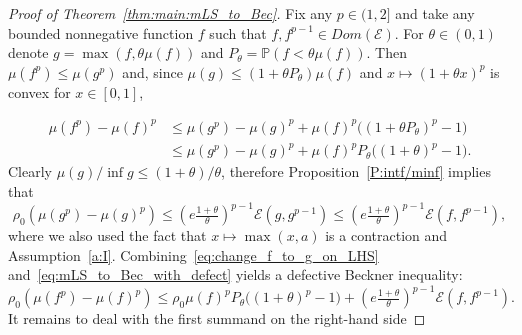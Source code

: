 \documentclass[a4paper]{amsart}
\theoremstyle{definition}
\theoremstyle{remark}
\numberwithin{equation}{section}
\newcommand*{\calE}{\mathcal{E}}
\begin{document}
\begin{proof}[Proof of Theorem~\ref{thm:main:mLS_to_Bec}]
Fix any $p\in(1,2]$ and take any bounded nonnegative function $f$ such that $f,f^{p-1}\in Dom(\calE)$.
For $\theta\in (0,1)$ denote $g = \max(f,\theta \mu(f))$ and $P_\theta = \mathbb{P}(f < \theta\mu(f))$.
	Then $\mu(f^p)\le \mu(g^p)$ and, since $\mu(g) \leq (1+\theta P_\theta)\mu(f)$ and $x\mapsto (1+\theta x)^p$ is convex for $x\in [0,1]$,

\begin{equation}\label{eq:change_f_to_g_on_LHS}
\begin{split}		\mu (f^p) -  \mu(f)^p
		&\le
		\mu (g^p) -  \mu(g)^p +
		\mu(f)^{p}\bigl((1+\theta P_{\theta})^p-1\bigr)\\
&\le
		\mu (g^p) -  \mu(g)^p +	
		\mu(f)^{p}P_{\theta}\bigl((1+\theta )^p-1\bigr).
		\end{split}
\end{equation}
	Clearly $\mu(g) / \inf g \le (1+\theta)/\theta$, therefore Proposition~\ref{P:intf/minf} implies that
        \begin{equation}
        \label{eq:mLS_to_Bec_with_defect}
         		\rho_0 (\mu (g^p) -  \mu(g)^p)
		\le
		\left(e\tfrac{1+\theta}{\theta}\right)^{p-1}\calE(g,g^{p-1})
		\le		\left(e\tfrac{1+\theta}{\theta}\right)^{p-1}\calE(f,f^{p-1}),
        \end{equation}
 where we also used the fact that $x\mapsto \max(x,a)$ is a contraction and Assumption~\ref{a:I}.
 Combining~\eqref{eq:change_f_to_g_on_LHS} and~\eqref{eq:mLS_to_Bec_with_defect} yields a defective Beckner inequality:
 \begin{equation}
 \label{eq:mLS_to_Bec_with_defect-2}
  \rho_0(\mu (f^p) -  \mu(f)^p)
		\le
	\rho_0\mu(f)^{p}P_{\theta}\bigl((1+\theta )^p-1\bigr)
+ \left(e\tfrac{1+\theta}{\theta}\right)^{p-1}\calE(f,f^{p-1}).
 \end{equation}
 It remains to deal with the first summand on the right-hand side
	

\end{proof}
\end{document}
